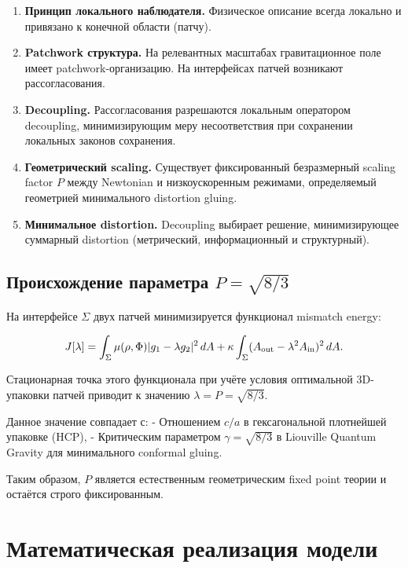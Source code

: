 \documentclass[12pt,a4paper]{article}
\begin{document}
\begin{enumerate}
\item \textbf{Принцип локального наблюдателя.} Физическое описание всегда локально и привязано к конечной области (патчу).
\item \textbf{Patchwork структура.} На релевантных масштабах гравитационное поле имеет patchwork-организацию. На интерфейсах патчей возникают рассогласования.
\item \textbf{Decoupling.} Рассогласования разрешаются локальным оператором decoupling, минимизирующим меру несоответствия при сохранении локальных законов сохранения.
\item \textbf{Геометрический scaling.} Существует фиксированный безразмерный scaling factor $P$ между Newtonian и низкоускоренным режимами, определяемый геометрией минимального distortion gluing.
\item \textbf{Минимальное distortion.} Decoupling выбирает решение, минимизирующее суммарный distortion (метрический, информационный и структурный).
\end{enumerate}

\subsection{Происхождение параметра \( P = \sqrt{8/3} \)}

На интерфейсе \(\Sigma\) двух патчей минимизируется функционал mismatch energy:

\begin{equation}
J[\lambda] = \int_{\Sigma} \mu(\rho,\Phi) |g_1 - \lambda g_2|^2 \, dA 
+ \kappa \int_{\Sigma} (A_{\rm out} - \lambda^2 A_{\rm in})^2 \, dA.
\end{equation}

Стационарная точка этого функционала при учёте условия оптимальной 3D-упаковки патчей приводит к значению \(\lambda = P = \sqrt{8/3}\).

Данное значение совпадает с:
- Отношением \(c/a\) в гексагональной плотнейшей упаковке (HCP),
- Критическим параметром \(\gamma = \sqrt{8/3}\) в Liouville Quantum Gravity для минимального conformal gluing.

Таким образом, \(P\) является естественным геометрическим fixed point теории и остаётся строго фиксированным.

\section{Математическая реализация модели}
\end{document}
